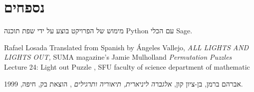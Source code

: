\documentclass[12pt,leqno]{article}
\begin{document}
\newpage
\section{נספחים}
מימוש של הפרויקט בוצע על ידי 
שפת תוכנה 
{Python}
עם הכלי 
{Sage}.


\newpage
\begin{thebibliography}{99}
\begin{english}
Rafael Losada
Translated from Spanish by Ángeles Vallejo,
\emph{
    ALL LIGHTS AND LIGHTS OUT,
}
SUMA magazine’s 
Jamie Mulholland
\emph{
    Permutation Puzzles
}
Lecture 24: Light out Puzzle , SFU faculty of science department of mathematic
\end{english}
אברהם ברמן, בן-ציון קון, 
\emph{
אלגברה ליניארית, תיאוריה ותרגילים
}
, הוצאת בק, חיפה, 1999.
\end{thebibliography}
\end{document}
